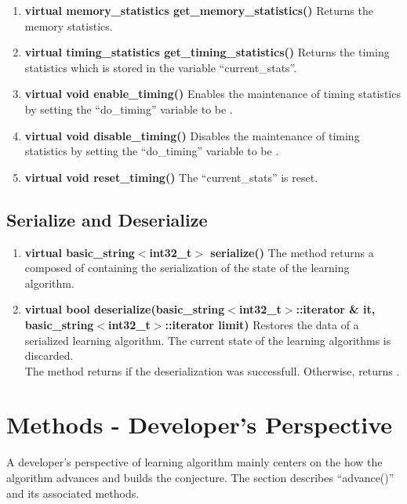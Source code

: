\begin{enumerate}
 \item \textbf{virtual memory\_statistics get\_memory\_statistics()} \vskip 1pt
	Returns the memory statistics.

 \item \textbf{virtual timing\_statistics get\_timing\_statistics()} \vskip 1pt
	Returns the timing statistics which is stored in the variable ``current\_stats''.

 \item \textbf{virtual void enable\_timing()} \vskip 1pt
	Enables the maintenance of timing statistics by setting the ``do\_timing'' variable to be \true.

 \item \textbf{virtual void disable\_timing()} \vskip 1pt
	Disables the maintenance of timing statistics by setting the ``do\_timing'' variable to be \false.

 \item \textbf{virtual void reset\_timing()} \vskip 1pt
	The ``current\_stats'' is reset.
\end{enumerate}



\subsection*{Serialize and Deserialize}

\begin{enumerate}
 \item \textbf{virtual basic\_string$<$int32\_t$>$ serialize()} \vskip 1pt
	The method returns a \stringtype composed of \integer containing the serialization of the state of the learning algorithm.

 \item \textbf{virtual bool deserialize(basic\_string$<$int32\_t$>$::iterator \& it, basic\_string$<$int32\_t$>$::iterator limit)} \vskip 1pt
	Restores the data of a serialized learning algorithm. The current state of the learning algorithms is discarded. \\
	The method returns \true if the deserialization was successfull. Otherwise, returns \false.
\end{enumerate}


\section{Methods - Developer's Perspective}
A developer's perspective of learning algorithm mainly centers on the how the algorithm advances and builds the conjecture. The section describes ``advance()'' and its associated methods.

